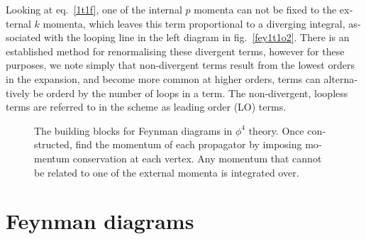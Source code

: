 \begin{english}
Looking at eq.~\eqref{1t1f}, one of the internal $p$ momenta can not be fixed to the external $k$ momenta, which leaves this term proportional to a diverging integral, associated with the looping line in the left diagram in fig.~\ref{fey1t1o2}. There is an established method for renormalising these divergent terms, however for these purposes, we note simply that non-divergent terms result from the lowest orders in the expansion, and become more common at higher orders, terms can alternatively be orderd by the number of loops in a term. The non-divergent, loopless terms are referred to in the scheme as leading order (LO) terms.

\begin{figure}[htb]
\hfill
{}
\hfill
{}
\hfill \phantom{d}
\caption{The building blocks for Feynman diagrams in $\phi^4$ theory. Once constructed, find the momentum of each propagator by imposing momentum conservation at each vertex. Any momentum that cannot be related to one of the external momenta is integrated over.
\label{ph4rules}}
\end{figure}

\section{Feynman diagrams}



\end{english}
